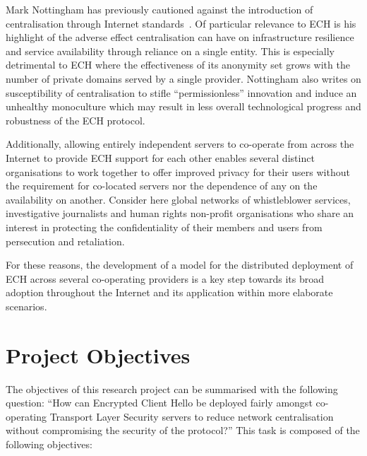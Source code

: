 Mark Nottingham has previously cautioned against the introduction of centralisation through Internet standards~\cite{rfc9518}. Of particular relevance to ECH is his highlight of the adverse effect centralisation can have on infrastructure resilience and service availability through reliance on a single entity. This is especially detrimental to ECH where the effectiveness of its anonymity set grows with the number of private domains served by a single provider. Nottingham also writes on susceptibility of centralisation to stifle ``permissionless'' innovation and induce an unhealthy monoculture which may result in less overall technological progress and robustness of the ECH protocol.

Additionally, allowing entirely independent servers to co-operate from across the Internet to provide ECH support for each other enables several distinct organisations to work together to offer improved privacy for their users without the requirement for co-located servers nor the dependence of any on the availability on another. Consider here global networks of whistleblower services, investigative journalists and human rights non-profit organisations who share an interest in protecting the confidentiality of their members and users from persecution and retaliation.

For these reasons, the development of a model for the distributed deployment of ECH across several co-operating providers is a key step towards its broad adoption throughout the Internet and its application within more elaborate scenarios.









\section{Project Objectives}

The objectives of this research project can be summarised with the following question: ``How can Encrypted Client Hello be deployed fairly amongst co-operating Transport Layer Security servers to reduce network centralisation without compromising the security of the protocol?'' This task is composed of the following objectives:

